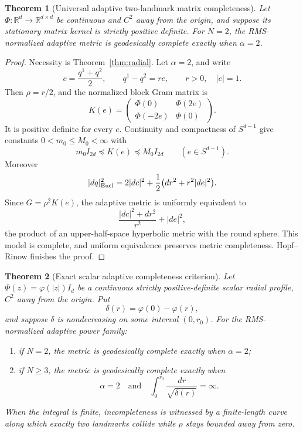 \documentclass[11pt]{article}
\newtheorem{theorem}{Theorem}
\newcommand{\R}{\mathbb{R}}
\begin{document}
\begin{theorem}[Universal adaptive two-landmark matrix completeness]
\label{thm:matrixNtwo}
Let \(\Phi:\R^d\to\R^{d\times d}\) be continuous and \(C^2\) away from the
origin, and suppose its stationary matrix kernel is strictly positive
definite.  For \(N=2\), the RMS-normalized adaptive metric is geodesically
complete exactly when \(\alpha=2\).
\end{theorem}

\begin{proof}
Necessity is Theorem~\ref{thm:radial}.  Let \(\alpha=2\), and write
\[
 c=\frac{q^1+q^2}{2},\qquad
 q^1-q^2=r e,\qquad r>0,\quad |e|=1.
\]
Then \(\rho=r/2\), and the normalized block Gram matrix is
\[
 K(e)=
 \begin{pmatrix}
  \Phi(0)&\Phi(2e)\\
  \Phi(-2e)&\Phi(0)
 \end{pmatrix}.
\]
It is positive definite for every \(e\).  Continuity and compactness of
\(S^{d-1}\) give constants \(0<m_0\le M_0<\infty\) with
\[
 m_0I_{2d}\preccurlyeq K(e)\preccurlyeq M_0I_{2d}
 \qquad(e\in S^{d-1}).
\]
Moreover
\[
 |dq|_{\rm Eucl}^2
 =2|dc|^2+\frac12\bigl(dr^2+r^2|de|^2\bigr).
\]
Since \(G=\rho^2K(e)\), the adaptive metric is uniformly equivalent to
\begin{equation}
 \frac{|dc|^2+dr^2}{r^2}+|de|^2,
 \label{eq:matrixNtwomodel}
\end{equation}
the product of an upper-half-space hyperbolic metric with the round sphere.
This model is complete, and uniform equivalence preserves metric
completeness.  Hopf--Rinow finishes the proof.
\end{proof}

\begin{theorem}[Exact scalar adaptive completeness criterion]
\label{thm:scalarcriterion}
Let \(\Phi(z)=\varphi(|z|)I_d\) be a continuous strictly
positive-definite scalar radial profile, \(C^2\) away from the origin.
Put
\[
 \delta(r)=\varphi(0)-\varphi(r),
\]
and suppose \(\delta\) is nondecreasing on some interval \((0,r_0)\).
For the RMS-normalized adaptive power family:
\begin{enumerate}
\item if \(N=2\), the metric is geodesically complete exactly when
  \(\alpha=2\);
\item if \(N\ge3\), the metric is geodesically complete exactly when
  \begin{equation}
   \alpha=2
   \quad\text{and}\quad
   \int_0^{r_0}\frac{dr}{\sqrt{\delta(r)}}=\infty.
   \label{eq:scalarcriterion}
  \end{equation}
\end{enumerate}
When the integral is finite, incompleteness is witnessed by a
finite-length curve along which exactly two landmarks collide while
\(\rho\) stays bounded away from zero.
\end{theorem}
\end{document}

